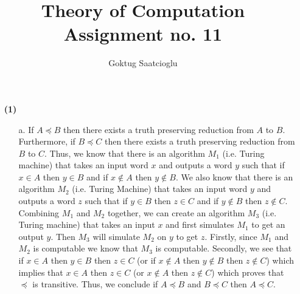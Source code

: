 \documentclass [10pt]{article}
\newcommand{\reduces}{\preceq}%
\begin{document}
\title{Theory of Computation Assignment no. 11}
\author{Goktug Saatcioglu}
\date{}
\maketitle

\begin{enumerate}
	\item[\textbf{(1)}]
	\begin{enumerate}
		\item[a.]If $A\reduces B$ then there exists a truth preserving reduction from $A$ to $B$. Furthermore, if $B\reduces C$ then there exists a truth preserving reduction from $B$ to $C$. Thus, we know that there is an algorithm $M_{1}$ (i.e. Turing machine) that takes an input word $x$ and outputs a word $y$ such that if $x\in A$ then $y\in B$ and if $x\notin A$ then $y\notin B$. We also know that there is an algorithm $M_{2}$ (i.e. Turing Machine) that takes an input word $y$ and outputs a word $z$ such that if $y\in B$ then $z\in C$ and if $y\notin B$ then $z\notin C$. Combining $M_{1}$ and $M_{2}$ together, we can create an algorithm $M_{3}$ (i.e. Turing machine) that takes an input $x$ and first simulates $M_{1}$ to get an output $y$. Then $M_{3}$ will simulate $M_{2}$ on $y$ to get $z$. Firstly, since $M_{1}$ and $M_{2}$ is computable we know that $M_{3}$ is computable. Secondly, we see that if $x\in A$ then $y\in B$ then $z\in C$ (or if $x\notin A$ then $y\notin B$ then $z\notin C$) which implies that $x\in A$ then $z\in C$ (or $x\notin A$ then $z\notin C$) which proves that $\reduces$ is transitive. Thus, we conclude if $A\reduces B$ and $B\reduces C$ then $A\reduces C$.

\end{enumerate}
\end{enumerate}
\end{document}
